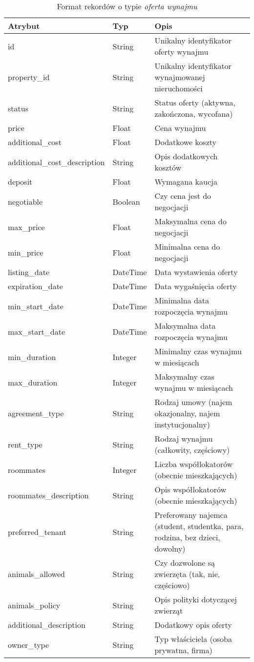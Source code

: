 \begin{table}[H]
    \caption{Format rekordów o typie \textit{oferta wynajmu}}
    \centering
    \begin{tabularx}{\textwidth}{|l|l|X|}
    \hline
    \textbf{Atrybut} & \textbf{Typ} & \textbf{Opis} \\
    \hline
    id & String & Unikalny identyfikator oferty wynajmu \\
    property\_id & String & Unikalny identyfikator wynajmowanej nieruchomości \\
    status & String & Status oferty (aktywna, zakończona, wycofana) \\
    price & Float & Cena wynajmu \\
    additional\_cost & Float & Dodatkowe koszty \\
    additional\_cost\_description & String & Opis dodatkowych kosztów \\
    deposit & Float & Wymagana kaucja \\
    negotiable & Boolean & Czy cena jest do negocjacji \\    
    max\_price & Float & Maksymalna cena do negocjacji \\
    min\_price & Float & Minimalna cena do negocjacji \\
    listing\_date & DateTime & Data wystawienia oferty \\
    expiration\_date & DateTime & Data wygaśnięcia oferty \\
    min\_start\_date & DateTime & Minimalna data rozpoczęcia wynajmu \\
    max\_start\_date & DateTime & Maksymalna data rozpoczęcia wynajmu \\
    min\_duration & Integer & Minimalny czas wynajmu w miesiącach \\
    max\_duration & Integer & Maksymalny czas wynajmu w miesiącach \\
    agreement\_type & String & Rodzaj umowy (najem okazjonalny, najem instytucjonalny) \\
    rent\_type & String & Rodzaj wynajmu (całkowity, częściowy) \\
    roommates & Integer & Liczba współlokatorów (obecnie mieszkających) \\
    roommates\_description & String & Opis współlokatorów (obecnie mieszkających) \\
    preferred\_tenant & String & Preferowany najemca (student, studentka, para, rodzina, bez dzieci, dowolny) \\
    animals\_allowed & String & Czy dozwolone są zwierzęta (tak, nie, częściowo) \\
    animals\_policy & String & Opis polityki dotyczącej zwierząt \\
    additional\_description & String & Dodatkowy opis oferty \\
    owner\_type & String & Typ właściciela (osoba prywatna, firma) \\
    \hline
    \end{tabularx}
    \label{tab:rent_offer_details}
\end{table}





